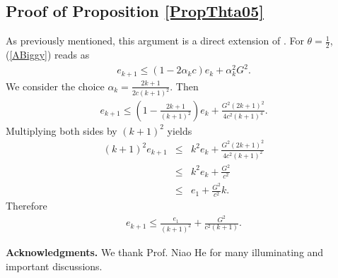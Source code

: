 \subsection{Proof of Proposition \ref{PropThta05}}\label{sec:PropProof}
As previously mentioned, this argument is a direct extension of \cite[Thm. 4]{karimi2016linear}. For $\theta=\frac{1}{2}$, (\ref{ABiggy}) reads as 
\begin{eqnarray*}
e_{k+1}\leq (1-2\alpha_k c)e_k+\alpha_k^2 G^2.
\end{eqnarray*}
We consider the choice $\alpha_k =\frac{2k+1}{2c(k+1)^2}$. Then
\begin{eqnarray*}
e_{k+1}
\leq
\left(
1-\frac{2k+1}{(k+1)^2}
\right)e_k+
\frac{G^2(2k+1)^2}{4 c^2(k+1)^4}.
\end{eqnarray*}
Multiplying both sides by $(k+1)^2$ yields
\begin{eqnarray*}
(k+1)^2e_{k+1}
&\leq&
k^2 e_k
+
\frac{G^2(2k+1)^2}{4 c^2(k+1)^2}
\\
&\leq&
k^2 e_k
+
\frac{G^2}{c^2}
\\
&\leq&
e_1+\frac{G^2}{c^2}k.
\end{eqnarray*}
Therefore
\begin{eqnarray*}
e_{k+1}
\leq
\frac{e_1}{(k+1)^2}
+
\frac{G^2}{c^2(k+1)}.
\end{eqnarray*}




 
 
{\bf Acknowledgments.} We thank Prof. Niao He for many illuminating and important discussions. 
